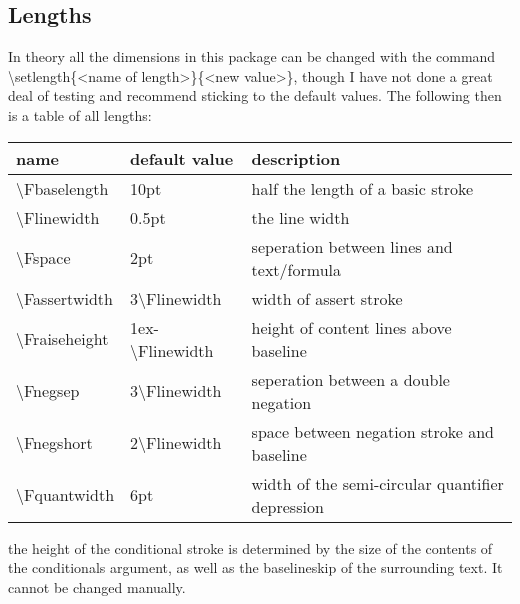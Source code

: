 \documentclass[12pt]{article}
\begin{document}
\subsection{Lengths}
  In theory all the dimensions in this package can be changed with the command 
  \textbackslash setlength\{\textless name of length\textgreater\}\{\textless new 
  value\textgreater\}, though I have not done a great deal of testing and recommend 
  sticking to the default values. The following then is a table of all lengths: \\
  \begin{tabular}{|l|l|l|}
    \hline
    name & default value & description \\
    \hline
    \textbackslash Fbaselength & 10pt & half the length of a basic stroke \\
    \textbackslash Flinewidth & 0.5pt & the line width \\
    \textbackslash Fspace & 2pt & seperation between lines and text/formula \\
    \textbackslash Fassertwidth & 3\textbackslash Flinewidth & width of assert 
    stroke \\
    \textbackslash Fraiseheight & 1ex-\textbackslash Flinewidth & height of content 
    lines above baseline \\
    \textbackslash Fnegsep & 3\textbackslash Flinewidth & seperation between a 
    double negation \\
    \textbackslash Fnegshort & 2\textbackslash Flinewidth & space between negation 
    stroke and baseline \\
    \textbackslash Fquantwidth & 6pt & width of the semi-circular quantifier 
    depression \\
    \hline
  \end{tabular}
  the height of the conditional stroke is determined by the size of the contents of 
  the conditionals argument, as well as the baselineskip of the surrounding text. It 
  cannot be changed manually.
\end{document}

